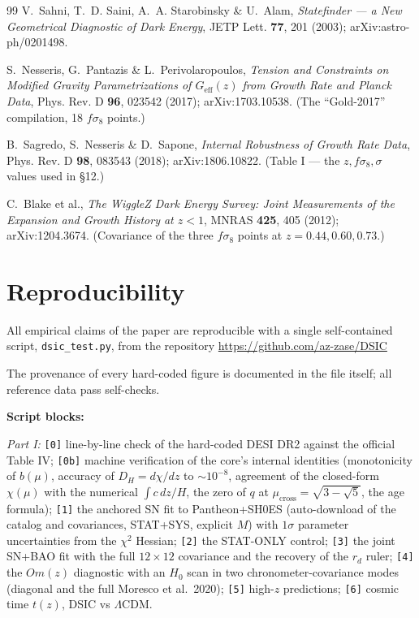 \documentclass{article}
\begin{document}
\begin{thebibliography}{99}
 V.~Sahni, T.~D. Saini, A.~A. Starobinsky \& U.~Alam, \textit{Statefinder --- a New Geometrical Diagnostic of Dark Energy}, JETP Lett. \textbf{77}, 201 (2003); arXiv:astro-ph/0201498.

 S.~Nesseris, G.~Pantazis \& L.~Perivolaropoulos, \textit{Tension and Constraints on Modified Gravity Parametrizations of $G_{\text{eff}}(z)$ from Growth Rate and Planck Data}, Phys. Rev. D \textbf{96}, 023542 (2017); arXiv:1703.10538. (The ``Gold-2017'' compilation, 18 $f\sigma_8$ points.)

 B.~Sagredo, S.~Nesseris \& D.~Sapone, \textit{Internal Robustness of Growth Rate Data}, Phys. Rev. D \textbf{98}, 083543 (2018); arXiv:1806.10822. (Table I --- the $z, f\sigma_8, \sigma$ values used in \S12.)

 C.~Blake et al., \textit{The WiggleZ Dark Energy Survey: Joint Measurements of the Expansion and Growth History at $z < 1$}, MNRAS \textbf{425}, 405 (2012); arXiv:1204.3674. (Covariance of the three $f\sigma_8$ points at $z = 0.44, 0.60, 0.73$.)

\end{thebibliography}

\newpage
\section*{Reproducibility}

All empirical claims of the paper are reproducible with a single self-contained script, \texttt{dsic\_test.py}, from the repository \url{https://github.com/az-zase/DSIC}

The provenance of every hard-coded figure is documented in the file itself; all reference data pass self-checks.

\medskip
\noindent\textbf{Script blocks:}

\medskip
\noindent\textit{Part I:} \texttt{[0]} line-by-line check of the hard-coded DESI DR2 against the official Table IV; \texttt{[0b]} machine verification of the core's internal identities (monotonicity of $b(\mu)$, accuracy of $D_H = d\chi/dz$ to ${\sim}10^{-8}$, agreement of the closed-form $\chi(\mu)$ with the numerical $\int c\,dz/H$, the zero of $q$ at $\mu_{\text{cross}} = \sqrt{3-\sqrt{5}}$, the age formula); \texttt{[1]} the anchored SN fit to Pantheon+SH0ES (auto-download of the catalog and covariances, STAT+SYS, explicit $M$) with $1\sigma$ parameter uncertainties from the $\chi^2$ Hessian; \texttt{[2]} the STAT-ONLY control; \texttt{[3]} the joint SN+BAO fit with the full $12\times12$ covariance and the recovery of the $r_d$ ruler; \texttt{[4]} the $Om(z)$ diagnostic with an $H_0$ scan in two chronometer-covariance modes (diagonal and the full Moresco et al.\ 2020); \texttt{[5]} high-$z$ predictions; \texttt{[6]} cosmic time $t(z)$, DSIC vs $\Lambda$CDM.
\end{document}

